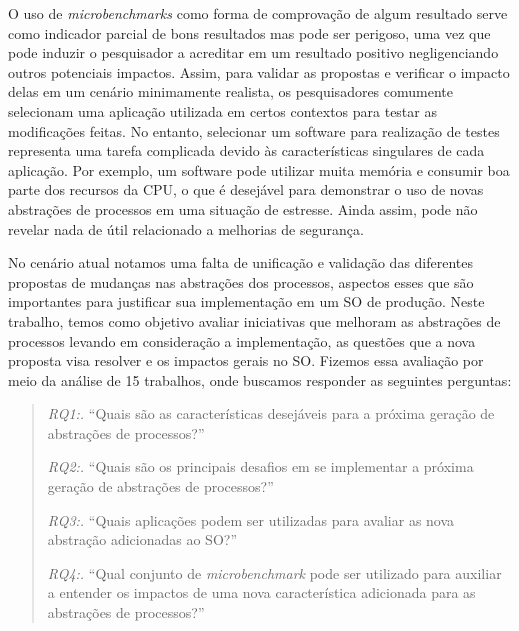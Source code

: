 O uso de
\textit{microbenchmarks} como forma de comprovação de algum resultado serve
como indicador parcial de bons resultados mas pode ser perigoso, uma vez que pode induzir o pesquisador a acreditar em um resultado
positivo negligenciando outros potenciais impactos. Assim,
para validar as propostas e verificar o impacto delas em um cenário
minimamente realista, os pesquisadores comumente selecionam uma aplicação
utilizada em certos contextos para testar as modificações feitas. No entanto,
selecionar um software para realização de testes representa uma tarefa
complicada devido às características singulares de cada aplicação. Por exemplo, um
software pode utilizar muita memória e consumir boa parte dos recursos da CPU,
o que é desejável para demonstrar o uso de novas abstrações de processos em uma
situação de estresse. Ainda assim, pode não revelar nada de útil relacionado a
melhorias de segurança.


No cenário atual notamos uma falta de unificação e validação das diferentes
propostas de mudanças nas abstrações dos processos, aspectos esses que são
importantes para justificar sua implementação em um SO de produção. Neste
trabalho, temos como objetivo avaliar iniciativas que melhoram as abstrações de
processos levando em consideração a implementação, as questões que a nova
proposta visa resolver e os impactos gerais no SO. Fizemos essa avaliação por
meio da análise de 15 trabalhos, onde buscamos responder as seguintes
perguntas:

\begin{quote}
 \item \textit{RQ1:.} ``Quais são as características desejáveis para a próxima geração de abstrações de processos?''
 \item \textit{RQ2:.} ``Quais são os principais desafios em se implementar a próxima geração de abstrações de processos?''
 \item \textit{RQ3:.} ``Quais aplicações podem ser utilizadas para avaliar as nova abstração adicionadas ao SO?''
 \item \textit{RQ4:.} ``Qual conjunto de \emph{microbenchmark} pode ser utilizado para auxiliar a entender os impactos de uma nova característica adicionada para as abstrações de processos?''
\end{quote}

